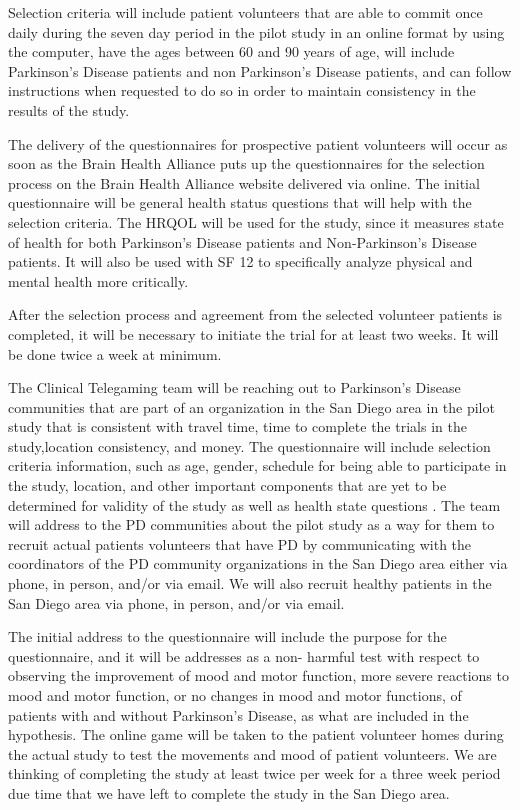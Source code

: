 \documentclass[12pt,letterpaper]{article}
\begin{document}
 Selection criteria will include patient volunteers that are able to commit once daily during the seven day period in the pilot study in an online format by using the computer, have the ages between 60 and 90 years of age, will include Parkinson's Disease patients and non Parkinson's Disease patients, and can follow instructions when requested to do so in order to maintain consistency in the results of the study. 
  
 The delivery of the questionnaires for prospective patient volunteers will occur as soon as the Brain Health Alliance puts up the questionnaires for the selection process on the Brain Health Alliance website delivered via online. The initial questionnaire will be general health status questions that will help with the selection criteria. The HRQOL will be used for the study, since it measures state of health for both Parkinson's Disease patients and Non-Parkinson's Disease patients. It will also be used with SF 12 to specifically analyze physical and mental health more critically. 

 After the selection process and agreement from the selected volunteer patients is completed, it will be necessary to initiate the trial for at least two weeks. It will be done twice a week at minimum.
 
 The Clinical Telegaming team will be reaching out to Parkinson's Disease communities that are part of an organization in the San Diego area in the pilot study that is consistent with travel time, time to complete
 the trials in the study,location consistency, and money. The questionnaire will include selection criteria information, such as age, gender, schedule for being able to participate in the study, location, and other important components that are yet to be determined for validity of the study as well as health state questions \cite{Jenkinson2011}. The team will address to the PD communities about the pilot study as a way for them to recruit actual patients volunteers that have PD by communicating with the coordinators of the PD community organizations in the San Diego area either via phone, in person, and/or via email. We will also recruit healthy patients in the San Diego area via phone, in person, and/or via email. 
 
 The initial address to the questionnaire will include the purpose for the questionnaire, and it will be addresses as a non- harmful test with respect to observing the improvement of mood and motor function, more severe reactions to mood and motor function, or no changes in mood and motor functions, of patients with and without Parkinson's Disease, as what are included in the hypothesis. The online game
 will be taken to the patient volunteer homes during the actual study to test the movements and mood of patient volunteers. We are thinking of completing the study at least twice per week for a three week period due time that we have left to complete the study in the San Diego area. 
 
\end{document}
